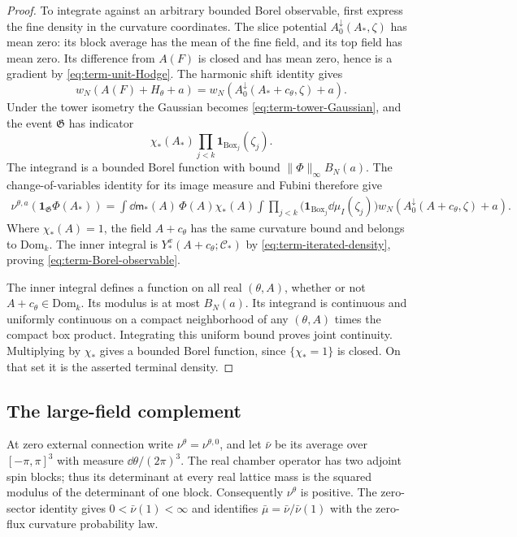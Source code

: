 \begin{proof}
To integrate against an arbitrary bounded Borel
observable, first express the fine density in the
curvature coordinates.
The slice potential $A_0^\downarrow(A_*,\zeta)$
has mean zero: its block average has the mean of
the fine field, and its top field has mean zero.
Its difference from $A(F)$ is closed and has mean
zero, hence is a gradient by
\eqref{eq:term-unit-Hodge}.
The harmonic shift identity gives
\[
 w_N(A(F)+H_\theta+a)
             =w_N(A_0^\downarrow(A_*+c_\theta,\zeta)+a).
\]
Under the tower isometry the Gaussian becomes
\eqref{eq:term-tower-Gaussian}, and the event
$\mathfrak G$ has indicator
\[
              \chi_*(A_*)\prod_{j<k}\mathbf1_{\mathrm{Box}_j}(\zeta_j).
\]
The integrand is a bounded Borel function with bound
$\|\Phi\|_\infty B_N(a)$.
The change-of-variables identity for its image
measure and Fubini therefore give
\begin{align*}
 \nu^{\theta,a}(\mathbf1_{\mathfrak G}\Phi(A_*))
   =\int\dd\mathsf m_*(A)\,\Phi(A)\chi_*(A)
      \int\prod_{j<k}
                      \big(\mathbf1_{\mathrm{Box}_j}\dd\mu_I(\zeta_j)\big)
                         w_N(A_0^\downarrow(A+c_\theta,\zeta)+a).
\end{align*}
Where $\chi_*(A)=1$, the field $A+c_\theta$ has
the same curvature bound and belongs to
$\mathrm{Dom}_k$. The inner integral is
$Y_*^x(A+c_\theta;\mathscr C_*)$ by
\eqref{eq:term-iterated-density}, proving
\eqref{eq:term-Borel-observable}.

The inner integral defines a function on all real
$(\theta,A)$, whether or not $A+c_\theta\in\mathrm{Dom}_k$.
Its modulus is at most $B_N(a)$.
Its integrand is continuous and uniformly continuous
on a compact neighborhood of any $(\theta,A)$
times the compact box product. Integrating this
uniform bound proves joint continuity.
Multiplying by $\chi_*$ gives a bounded Borel
function, since $\{\chi_*=1\}$ is closed.
On that set it is the asserted terminal density.
\end{proof}

\subsection{The large-field complement}
\label{subsec:term-complement}

At zero external connection write $\nu^\theta=\nu^{\theta,0}$,
and let $\bar\nu$ be its average over $[-\pi,\pi]^3$
with measure $\dd\theta/(2\pi)^3$.
The real chamber operator has two adjoint spin blocks;
thus its determinant at every real lattice mass is
the squared modulus of the determinant of one block.
Consequently $\nu^\theta$ is positive.
The zero-sector identity
\cite[(40)]{ReferenceResponse} gives
$0<\bar\nu(1)<\infty$ and identifies
$\bar\mu=\bar\nu/\bar\nu(1)$ with the zero-flux
curvature probability law.

